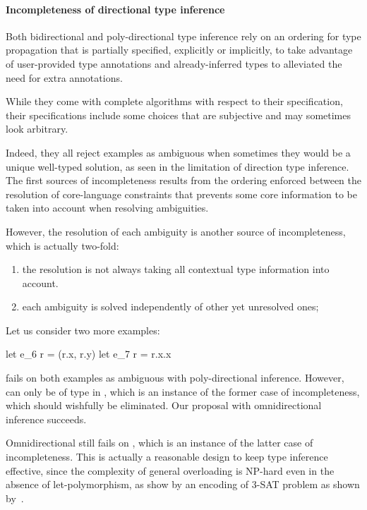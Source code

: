 \documentclass[acmsmall,screen,nonacm]{acmart}
\begin{document}
\paragraph{Incompleteness of directional type inference}

Both bidirectional and poly-directional type inference rely on an ordering
for type propagation that is partially specified, explicitly or implicitly,
to take advantage of user-provided type annotations and already-inferred types
to alleviated the need for extra annotations.

While they come with complete algorithms with respect to their
specification, their specifications include some choices that are subjective
and may sometimes look arbitrary.

Indeed, they all reject examples as ambiguous when sometimes they would be a
unique well-typed solution, as seen in the limitation of direction type
inference.  The first sources of incompleteness results from the ordering
enforced between the resolution of core-language constraints that prevents
some core information to be taken into account when resolving ambiguities.

However, the resolution of each ambiguity is another source of
incompleteness, which is actually two-fold:
\begin{enumerate}
\item  
  the resolution is not always taking all contextual type information into
  account.  
\item
  each ambiguity is solved independently of other yet unresolved ones;
\end{enumerate}
Let us consider two more examples: 
\begin{program}[error]
let e_6 r = (r.x, r.y)
let e_7 r = r.x.x
\end{program}
\OCaml fails on both examples as ambiguous with poly-directional inference.
However,  can only be of type  in ,
which is an instance of the former case of incompleteness, which should
wishfully be eliminated. Our proposal with omnidirectional inference
succeeds.

Omnidirectional still fails on , which is an instance of the
latter case of incompleteness. This is actually a reasonable design to keep
type inference effective, since the complexity of general overloading is
NP-hard even in the absence of let-polymorphism, as show by an encoding of
3-SAT problem as shown by~\citet
{Chargueraud-Bodin-Dunfield-Riboulet/jfla2025}.
\end{document}
